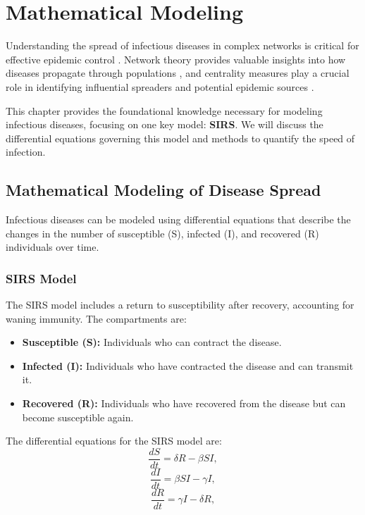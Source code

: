 \chapter{Mathematical Modeling}

Understanding the spread of infectious diseases in complex networks is critical for effective epidemic control \cite{hellewell2020, britton2021}. Network theory provides valuable insights into how diseases propagate through populations \cite{newman2010}, and centrality measures play a crucial role in identifying influential spreaders and potential epidemic sources \cite{gomez2011}.

This chapter provides the foundational knowledge necessary for modeling infectious diseases, focusing on one key model: \textbf{SIRS}. We will discuss the differential equations governing this model and methods to quantify the speed of infection.

\section{Mathematical Modeling of Disease Spread}
Infectious diseases can be modeled using differential equations that describe the changes in the number of susceptible (S), infected (I), and recovered (R) individuals over time.

\subsection{SIRS Model}
The SIRS model includes a return to susceptibility after recovery, accounting for waning immunity. The compartments are:
\begin{itemize}
    \item \textbf{Susceptible (S):} Individuals who can contract the disease.
    \item \textbf{Infected (I):} Individuals who have contracted the disease and can transmit it.
    \item \textbf{Recovered (R):} Individuals who have recovered from the disease but can become susceptible again.
\end{itemize}
\noindent
The differential equations for the SIRS model are:
\begin{equation}
\frac{dS}{dt} = \delta R - \beta SI,
\label{equation:3.1}
\end{equation}
\begin{equation}
\frac{dI}{dt} = \beta SI - \gamma I,
\label{equation:3.2}
\end{equation}
\begin{equation}
\frac{dR}{dt} = \gamma I - \delta R,
\label{equation:3.3}
\end{equation}

